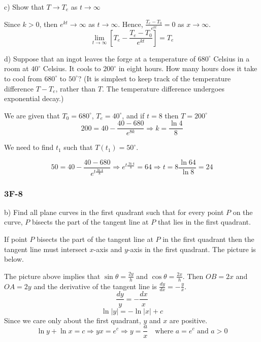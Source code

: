 \documentclass{article}
\begin{document}
\begin{tcolorbox}
    c) Show that $T \to T_e$ as $t \to \infty$
\end{tcolorbox}
Since $k > 0$, then  $e^{kt} \to \infty$ as $t \to \infty$. Hence, $\frac{T_e - T_0}{e^{kt}} = 0$ as $x \to \infty$.
\[ \lim_{t \to \infty}{\left[ T_e - \frac{T_e - T_0}{e^{kt}} \right]} = T_e \]

\begin{tcolorbox}
    d) Suppose that an ingot leaves the forge at a temperature of $680^{\circ}$ Celsius in a room at $40^{\circ}$ Celsius. It cools to $200^{\circ}$ in eight hours. How many hours does it take to cool from $680^{\circ}$ to $50^{\circ}$? (It is simplest to keep track of the temperature difference $T - T_e$, rather than $T$. The temperature difference undergoes exponential decay.)
\end{tcolorbox}

We are given that $T_0 = 680^{\circ}$, $T_e = 40^{\circ}$, and if $t = 8$ then $T = 200^{\circ}$
\[ 200 =  40 - \frac{40 - 680}{e^{8k}} \Rightarrow k = \frac{\ln{4}}{8}\]
\par We need to find $t_1$ such that $T(t_1) = 50^{\circ}$. 

\[ 50 = 40 - \frac{40 - 680}{e^{t\frac{\ln{4}}{8}}} \Rightarrow e^{t\frac{\ln{4}}{8}} = 64 \Rightarrow t = 8\frac{\ln{64}}{\ln{8}} = 24 \]

\subsubsection{3F-8}
\begin{tcolorbox}
    b) Find all plane curves in the first quadrant such that for every point $P$ on the curve, $P$ bisects the part of the tangent line at $P$ that lies in the first quadrant.
\end{tcolorbox}
If point $P$ bisects the part of the tangent line at $P$ in the first quadrant then the tangent line must intersect $x$-axis and $y$-axis in the first quadrant. The picture is below.
\begin{figure}[htp!]
    \centering
    
    \label{fig:fig1}
\end{figure}
\par The picture above implies that $\sin{\theta} = \frac{2y}{h}$ and $\cos{\theta} = \frac{2x}{h}$. Then $OB = 2x$ and $OA = 2y$ and the derivative of the tangent line is $\frac{dy}{dx} = -\frac{y}{x}$.
\[ \frac{dy}{y} = -\frac{dx}{x} \]
\[ \ln{|y|} = -\ln{|x|} + c \]
Since we care only about the first quadrant, $y$ and $x$ are positive.
\[ \ln{y} + \ln{x} = c \Rightarrow yx = e^c \Rightarrow y = \frac{a}{x} \quad {\text{where $a = e^c$ and $a > 0$}} \]
\end{document}
